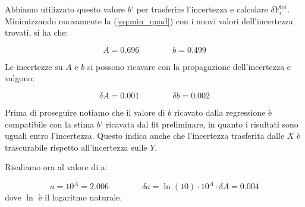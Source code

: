 Abbiamo utilizzato questo valore $b'$ per trasferire l'incertezza e calcolare $\delta Y_i^{\text{tot}}$. Minimizzando nuovamente la 
(\ref{eq:min_quad}) con i nuovi valori dell'incertezza trovati, si ha che:

\begin{equation}
    A = 0.696 \qquad \qquad b = 0.499
\end{equation}

Le incertezze su $A$ e $b$ si possono ricavare con la propagazione dell'incertezza e valgono:

\begin{equation}
    \delta A = 0.001 \qquad \qquad \delta b = 0.002
\end{equation}

Prima di proseguire notiamo che il valore di $b$ ricavato dalla regressione è compatibile con la stima $b'$
ricavata dal fit preliminare, in quanto i risultati sono uguali entro l'incertezza. Questo indica anche che
l'incertezza trasferita dalle $X$ è trascurabile rispetto all'incertezza sulle $Y$.

Risaliamo ora al valore di a:

\begin{equation}
    a = 10^A = 2.006 \qquad \qquad \delta a = \ln(10) \cdot 10^A \cdot \delta A = 0.004
\end{equation}
%
dove $\ln$ è il logaritmo naturale.

